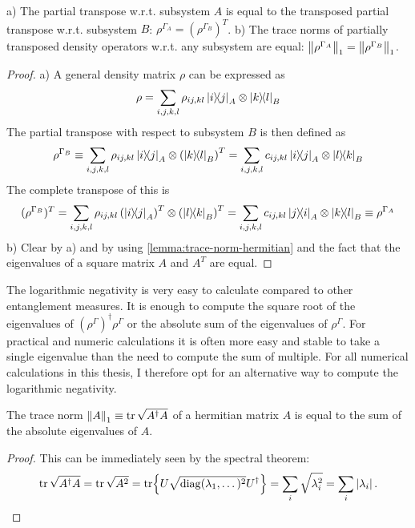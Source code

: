 \begin{proposition}
  a) The partial transpose w.r.t. subsystem $A$ is equal to the transposed partial transpose w.r.t. subsystem $B$: $\rho^{\Gamma_A} = (\rho^{\Gamma_B})^T$. 
  b) The trace norms of partially transposed density operators w.r.t. any subsystem are equal: $\left\lVert\rho^{\Gamma_A}\right\rVert_1 = \left\lVert\rho^{\Gamma_B}\right\rVert_1$.
\end{proposition}
\begin{proof}
  a) A general density matrix $\rho$ can be expressed as
  \begin{equation*}
    \rho = \sum_{i,j,k,l} \rho_{ij,kl} \ketbra{i}{j}_A\otimes\ketbra{k}{l}_B
  \end{equation*}
  The partial transpose with respect to subsystem $B$ is then defined as 
  \begin{equation*}
    \rho^{\Gamma_B} \equiv \sum_{i,j,k,l} \rho_{ij,kl} \ketbra{i}{j}_A\otimes\left(\ketbra{k}{l}_B\right)^T = \sum_{i,j,k,l} c_{ij,kl} \ketbra{i}{j}_A\otimes\ketbra{l}{k}_B
  \end{equation*}
  The complete transpose of this is
  \begin{equation*}
    (\rho^{\Gamma_B})^T = \sum_{i,j,k,l} \rho_{ij,kl} \left(\ketbra{i}{j}_A\right)^T\otimes\left(\ketbra{l}{k}_B\right)^T = \sum_{i,j,k,l} c_{ij,kl} \ketbra{j}{i}_A\otimes\ketbra{k}{l}_B \equiv \rho^{\Gamma_A}
  \end{equation*}
  b) Clear by a) and by using \cref{lemma:trace-norm-hermitian} and the fact that the eigenvalues of a square matrix $A$ and $A^T$ are equal.
\end{proof}

The logarithmic negativity is very easy to calculate compared to other entanglement measures. It is enough to compute the square root of the eigenvalues of $(\rho^{\Gamma})^\dagger \rho^{\Gamma}$ or the absolute sum of the eigenvalues of $\rho^{\Gamma}$.
For practical and numeric calculations it is often more easy and stable to take a single eigenvalue than the need to compute the sum of multiple. 
For all numerical calculations in this thesis, I therefore opt for an alternative way to compute the logarithmic negativity.

\begin{lemma}\label{lemma:trace-norm-hermitian}
  The trace norm $\left\lVert A\right\rVert_1 \equiv \tr \sqrt{A^\dagger A}$ of a hermitian matrix $A$ is equal to the sum of the absolute eigenvalues of $A$.
\end{lemma}
\begin{proof}
  This can be immediately seen by the spectral theorem:
  \begin{equation*}
    \tr \sqrt{A^\dagger A} = \tr \sqrt{A^2} = \tr{U\sqrt{\operatorname{diag}(\lambda_1, \dots)^2}U^\dagger} = \sum_i \sqrt{\lambda_i^2} = \sum_i \left\lvert\lambda_i\right\rvert.
  \end{equation*}
\end{proof}

